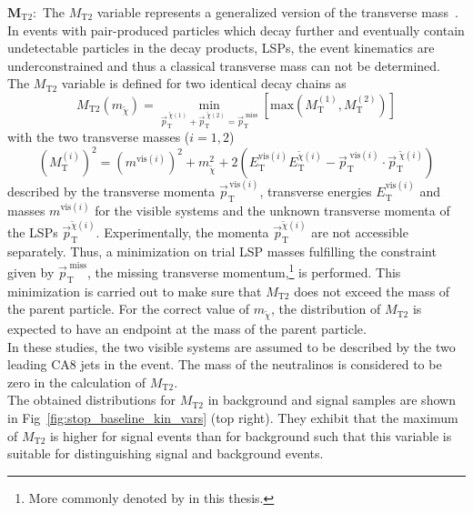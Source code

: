 \begin{description}
 \item $\mathbf{M_\mathrm{T2}:}$ The $M_\mathrm{T2}$ variable represents a generalized version of the transverse mass~\cite{Lester:1999tx, Barr:2003rg, Chatrchyan:2012jx, CMS-PAS-SUS-13-019}. In events with pair-produced particles which decay further and eventually contain undetectable particles in the decay products, \eg LSPs, the event kinematics are underconstrained and thus a classical transverse mass can not be determined. The $M_\mathrm{T2}$ variable is defined for two identical decay chains as
\begin{equation}
 M_\mathrm{T2}(m_{\tilde{\chi}}) = \min_{\vec{p}_\mathrm{T}^{\;\tilde{\chi}(1)} + \vec{p}_\mathrm{T}^{\;\tilde{\chi}(2)} = \vec{p}_\mathrm{T}^{\; \mathrm{miss}}} \left[ \mathrm{max} \left(M_\mathrm{T}^{(1)}, M_\mathrm{T}^{(2)} \right) \right] 
\end{equation} 
with the two transverse masses ($i = 1, 2$)
\begin{equation}
 (M_\mathrm{T}^{(i)})^2 = (m^{\mathrm{vis}(i)})^2 + m_{\tilde{\chi}}^2 + 2 \left( E_\mathrm{T}^{\mathrm{vis}(i)} E_\mathrm{T}^{\tilde{\chi}(i)} - \vec{p}_\mathrm{T}^{\; \mathrm{vis}(i)} \cdot \vec{p}_\mathrm{T}^{\; \tilde{\chi}(i)}   \right) 
\end{equation}
described by the transverse momenta $\vec{p}_\mathrm{T}^{\, \mathrm{vis}(i)}$, transverse energies $E_\mathrm{T}^{\mathrm{vis}(i)}$ and masses $m^{\mathrm{vis}(i)}$ for the visible systems and the unknown transverse momenta of the LSPs $\vec{p}_\mathrm{T}^{\tilde{\chi}(i)} $. Experimentally, the momenta $\vec{p}_\mathrm{T}^{\tilde{\chi}(i)}$ are not accessible separately. Thus, a minimization on trial LSP masses fulfilling the constraint given by $\vec{p}_\mathrm{T}^{\; \mathrm{miss}}$, the missing transverse momentum,\footnote{More commonly denoted by \metvec in this thesis.} is performed. This minimization is carried out to make sure that $M_\mathrm{T2}$ does not exceed the mass of the parent particle. For the correct value of $m_{\tilde{\chi}}$, the distribution of $M_\mathrm{T2}$ is expected to have an endpoint at the mass of the parent particle. \\
In these studies, the two visible systems are assumed to be described by the two leading CA8 jets in the event. The mass of the neutralinos is considered to be zero in the calculation of $M_\mathrm{T2}$. \\ 
The obtained distributions for $M_\mathrm{T2}$ in background and signal samples are shown in Fig~\ref{fig:stop_baseline_kin_vars} (top right). They exhibit that the maximum of $M_\mathrm{T2}$ is higher for signal events than for background such that this variable is suitable for distinguishing signal and background events.  

\end{description}
